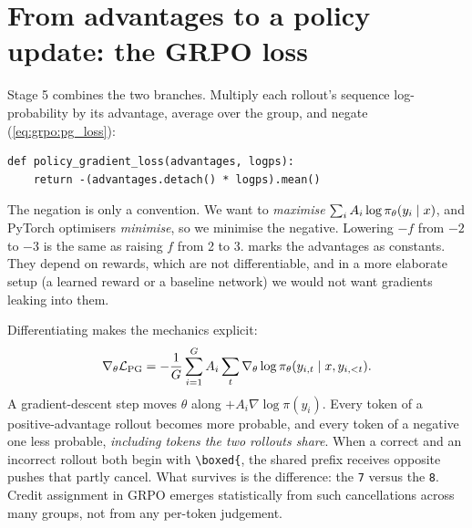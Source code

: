 \section{From advantages to a policy update: the GRPO loss}\label{sec:grpo:loss}

Stage 5 combines the two branches. Multiply each rollout's sequence log-probability by its
advantage, average over the group, and negate (\cref{eq:grpo:pg_loss}):

\begin{lstlisting}[caption={The policy-gradient loss.},label={lst:grpo:pgloss}]
def policy_gradient_loss(advantages, logps):
    return -(advantages.detach() * logps).mean()
\end{lstlisting}

The negation is only a convention. We want to \emph{maximise}
$\sum_iA_i\log\pi_\theta(y_i\mid x)$, and PyTorch optimisers \emph{minimise}, so we minimise the
negative. Lowering $-f$ from $-2$ to $-3$ is the same as raising $f$ from 2 to 3.
 marks the advantages as constants. They depend on rewards, which are not
differentiable, and in a more elaborate setup (a learned reward or a baseline network) we
would not want gradients leaking into them.

Differentiating makes the mechanics explicit:
\begin{equation}
\nabla_\theta\mathcal{L}_{\text{PG}}=-\frac1G\sum_{i=1}^G A_i\sum_t\nabla_\theta\log\pi_\theta(y_{i,t}\mid x,y_{i,<t}).
\end{equation}
A gradient-descent step moves $\theta$ along $+A_i\nabla\log\pi(y_i)$. Every token of a
positive-advantage rollout becomes more probable, and every token of a negative one less
probable, \emph{including tokens the two rollouts share}. When a correct and an incorrect
rollout both begin with \verb|\boxed{|, the shared prefix receives opposite pushes that
partly cancel. What survives is the difference: the \verb|7| versus the \verb|8|.
Credit assignment in GRPO emerges statistically from such cancellations across many groups,
not from any per-token judgement.

